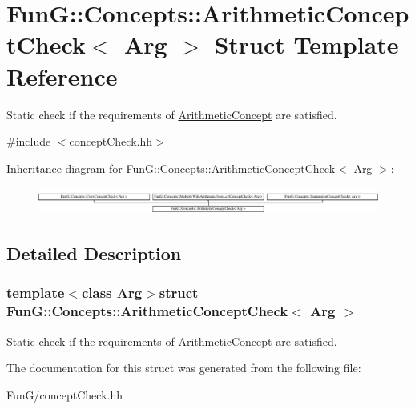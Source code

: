 \hypertarget{structFunG_1_1Concepts_1_1ArithmeticConceptCheck}{\section{Fun\-G\-:\-:Concepts\-:\-:Arithmetic\-Concept\-Check$<$ Arg $>$ Struct Template Reference}
\label{structFunG_1_1Concepts_1_1ArithmeticConceptCheck}
}


Static check if the requirements of \hyperlink{structFunG_1_1Concepts_1_1ArithmeticConcept}{Arithmetic\-Concept} are satisfied.  




{\ttfamily \#include $<$concept\-Check.\-hh$>$}

Inheritance diagram for Fun\-G\-:\-:Concepts\-:\-:Arithmetic\-Concept\-Check$<$ Arg $>$\-:\begin{figure}[H]
\begin{center}
\leavevmode
\includegraphics[height=0.893142cm]{structFunG_1_1Concepts_1_1ArithmeticConceptCheck}
\end{center}
\end{figure}


\subsection{Detailed Description}
\subsubsection*{template$<$class Arg$>$struct Fun\-G\-::\-Concepts\-::\-Arithmetic\-Concept\-Check$<$ Arg $>$}

Static check if the requirements of \hyperlink{structFunG_1_1Concepts_1_1ArithmeticConcept}{Arithmetic\-Concept} are satisfied. 

The documentation for this struct was generated from the following file\-:\begin{DoxyCompactItemize}
\item 
Fun\-G/concept\-Check.\-hh\end{DoxyCompactItemize}
